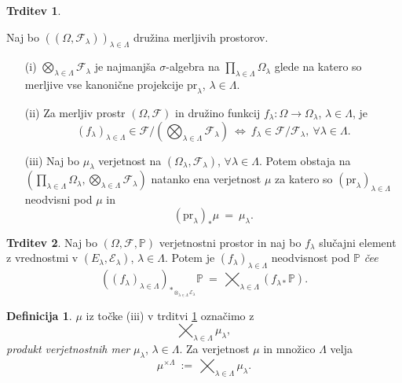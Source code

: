 \documentclass[11pt]{article}
\renewcommand{\P}{\mathbb{P}}
\newcommand{\F}{\mathcal{F}}
\newcommand{\EE}{\mathcal{E}}
\newcommand{\oklepaj}[1]{\left(#1\right)}
\newcommand{\1}{\mathbbm{1}}
\newcommand{\pr}{\text{pr}}
\theoremstyle{definition}
\newtheorem{definicija}{Definicija}[section]
\theoremstyle{definition}
\newtheorem{trditev}{Trditev}[section]
\theoremstyle{definition}
\theoremstyle{definition}
\begin{document}
\begin{trditev}\label{ref:3.7}

Naj bo $\oklepaj{(\Omega, \F_\lambda)}_{\lambda\in\Lambda}$ družina merljivih prostorov.
\begin{itemize}

\item[(i)] $\bigotimes_{\lambda\in\Lambda} \F_\lambda$ je najmanjša $\sigma$-algebra na $\prod_{\lambda\in\Lambda} \Omega_\lambda$ glede na katero so merljive vse kanonične projekcije $\pr_\lambda$, $\lambda\in\Lambda$.

\item[(ii)] Za merljiv prostr $(\Omega, \F)$ in družino funkcij $f_\lambda: \Omega \rightarrow \Omega_\lambda$, $\lambda\in\Lambda$, je
$$(f_\lambda)_{\lambda\in\Lambda} \in \F/(\bigotimes_{\lambda\in\Lambda} \F_\lambda) ~\iff~ f_\lambda \in \F/\F_\lambda, ~ \forall \lambda \in \Lambda.$$

\item[(iii)] Naj bo $\mu_\lambda$ verjetnost na $(\Omega_\lambda, \F_\lambda)$, $\forall \lambda \in \Lambda$. Potem obstaja na $\oklepaj{\prod_{\lambda\in\Lambda}\Omega_\lambda, \bigotimes_{\lambda\in\Lambda} \F_\lambda}$ natanko ena verjetnost $\mu$ za katero so $(\pr_\lambda)_{\lambda\in\Lambda}$ neodvisni pod $\mu$ in
$$(\pr_\lambda)_*\mu ~=~ \mu_\lambda.$$

\end{itemize}

\end{trditev}
\vspace{0.5cm}

\begin{trditev}

Naj bo $(\Omega, \F, \P)$ verjetnostni prostor in naj bo $f_\lambda$ slučajni element z vrednostmi v $(E_\lambda, \EE_\lambda)$, $\lambda\in\Lambda$. Potem je $(f_\lambda)_{\lambda\in\Lambda}$ neodvisnost pod $\P$ \textit{čee}
$$\oklepaj{(f_\lambda)_{\lambda\in\Lambda}}_{*_{\otimes_{\lambda\in\Lambda}\EE_\lambda}}\P ~=~ \bigtimes_{\lambda\in\Lambda} ({f_{\lambda*}} \P).$$

\end{trditev}
\vspace{0.5cm}

\begin{definicija}

$\mu$ iz točke (iii) v trditvi \ref{ref:3.7} označimo z 
$$\bigtimes_{\lambda\in\Lambda} \mu_\lambda,$$
\textit{produkt verjetnostnih mer} $\mu_\lambda$, $\lambda\in\Lambda$. Za verjetnost $\mu$ in množico $\Lambda$ velja
$$\mu^{\times\Lambda} ~:=~ \bigtimes_{\lambda\in\Lambda} \mu_\lambda.$$

\end{definicija}
\vspace{0.5cm}
\end{document}
